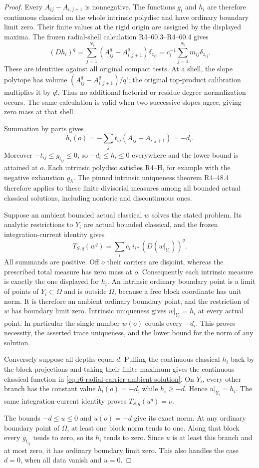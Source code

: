 \documentclass[11pt,a4paper]{article}
\numberwithin{equation}{section}
\theoremstyle{definition}
\theoremstyle{remark}
\begin{document}
\begin{proof}
Every $A_{ij}-A_{i,j+1}$ is nonnegative. The functions $g_t$ and
$h_i$ are therefore continuous classical on the whole intrinsic
polydisc and have ordinary boundary limit zero. Their finite values
at the rigid origin are assigned by the displayed maxima. The
frozen radial-shell calculation
\textup{R4--60.3}--\textup{R4--60.4}
gives
\[
 (Dh_i)^q
   =\sum_{j=1}^{N_i}(A_{ij}^q-A_{i,j+1}^q)\delta_{z_{ij}}
   =c_i^{-1}\sum_{j=1}^{N_i}m_{ij}\delta_{z_{ij}}.
\]
These are identities against all original compact tests. At a shell,
the slope polytope has volume
$(A_{ij}^q-A_{i,j+1}^q)/q!$; the original top-product
calibration multiplies it by $q!$. Thus no additional factorial or
residue-degree normalization occurs. The same calculation is valid
when two successive slopes agree, giving zero mass at that shell.

Summation by parts gives
\[
 h_i(o)=-\sum_j t_{ij}(A_{ij}-A_{i,j+1})
       =-d_i.
\]
Moreover $-t_{ij}\le g_{t_{ij}}\le0$, so
$-d_i\le h_i\le0$ everywhere and the lower bound is attained at
$o$. Each intrinsic polydisc satisfies
\textup{R4--H}, for example with the negative
exhaustion $g_\lambda$. The pinned intrinsic uniqueness theorem
\textup{R4--48.4} therefore applies to these
finite divisorial measures among all bounded actual classical
solutions, including nontoric and discontinuous ones.

Suppose an ambient bounded actual classical $w$ solves the stated
problem. Its analytic restrictions to $Y_i$ are actual bounded
classical, and the frozen integration-current identity gives
\[
           T_{S,q}(w^q)=\sum_i c_i\,i_{i*}(D(w|_{Y_i}))^q.
\]
All summands are positive. Off $o$ their carriers are disjoint,
whereas the prescribed total measure has zero mass at $o$.
Consequently each intrinsic measure is exactly the one displayed
for $h_i$. An intrinsic ordinary boundary point is a limit of
points of $Y_i\subset\Omega$ and is outside $\Omega$, because
a free block coordinate has unit norm. It is therefore an ambient
ordinary boundary point, and the restriction of $w$ has boundary
limit zero. Intrinsic uniqueness gives $w|_{Y_i}=h_i$ at every
actual point. In particular the single number $w(o)$ equals every
$-d_i$. This proves necessity, the asserted trace uniqueness, and
the lower bound for the norm of any solution.

Conversely suppose all depths equal $d$. Pulling the continuous
classical $h_i$ back by the block projections and taking their
finite maximum gives the continuous classical function in
\eqref{eq:r6-radial-carrier-ambient-solution}. On $Y_i$, every
other branch has the constant value $h_l(o)=-d$, while
$h_i\ge-d$. Hence $u|_{Y_i}=h_i$. The same integration-current
identity proves $T_{S,q}(u^q)=\nu$.

The bounds $-d\le u\le0$ and $u(o)=-d$ give its exact norm.
At any ordinary boundary point of $\Omega$, at least one block
norm tends to one. Along that block every $g_{t_{ij}}$ tends to
zero, so its $h_i$ tends to zero. Since $u$ is at least this branch
and at most zero, it has ordinary boundary limit zero. This also
handles the case $d=0$, when all data vanish and $u=0$.
\end{proof}
\end{document}
